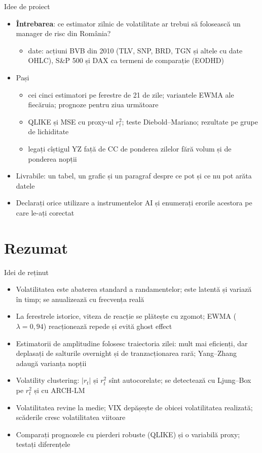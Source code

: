 \begin{frame}{Idee de proiect}
\itemsize{\small}
\begin{itemize}
    \item \textbf{Întrebarea}: ce estimator zilnic de volatilitate ar trebui să folosească un manager de risc din România?
    \begin{itemize}
        \item date: acțiuni BVB din 2010 (TLV, SNP, BRD, TGN și altele cu date OHLC), S\&P 500 și DAX ca termeni de comparație (EODHD)
    \end{itemize}
    \item Pași
    \begin{itemize}
        \item cei cinci estimatori pe ferestre de 21 de zile; variantele EWMA ale fiecăruia; prognoze pentru ziua următoare
        \item QLIKE și MSE cu proxy-ul $r_t^2$; teste Diebold--Mariano; rezultate pe grupe de lichiditate
        \item legați cîștigul YZ față de CC de ponderea zilelor fără volum și de ponderea nopții
    \end{itemize}
    \item Livrabile: un tabel, un grafic și un paragraf despre ce pot și ce nu pot arăta datele
    \item Declarați orice utilizare a instrumentelor AI și enumerați erorile acestora pe care le-ați corectat
\end{itemize}
\end{frame}


\section{Rezumat}

\begin{frame}{Idei de reținut}
\itemsize{\small}
\begin{itemize}
    \item Volatilitatea este abaterea standard a randamentelor; este latentă și variază în timp; se anualizează cu frecvența reală
    \item La ferestrele istorice, viteza de reacție se plătește cu zgomot; EWMA ($\lambda = 0{,}94$) reacționează repede și evită ghost effect
    \item Estimatorii de amplitudine folosesc traiectoria zilei: mult mai eficienți, dar deplasați de salturile overnight și de tranzacționarea rară; Yang--Zhang adaugă varianța nopții
    \item Volatility clustering: $|r_t|$ și $r_t^2$ sînt autocorelate; se detectează cu Ljung--Box pe $r_t^2$ și cu ARCH-LM
    \item Volatilitatea revine la medie; VIX depășește de obicei volatilitatea realizată; scăderile cresc volatilitatea viitoare
    \item Comparați prognozele cu pierderi robuste (QLIKE) și o variabilă proxy; testați diferențele
\end{itemize}
\end{frame}

